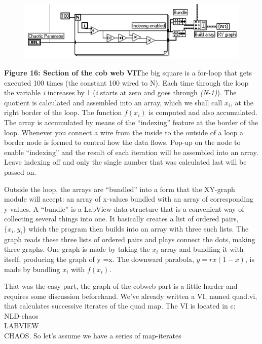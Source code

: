 \documentclass{../lab}
\begin{document}
\begin{figure}[h]
    \centering
    \href{http://experimentationlab.berkeley.edu/sites/default/files/images/Nldimage082.gif}{\includegraphics[width=0.5\linewidth]{images/Nldimage082.png}}
    \caption{}
    \label{fig:Nldimage082}
\end{figure}

\textbf{Figure 16: Section of the cob web VI}The big square is a for-loop that gets executed 100 times (the constant 100 wired to N). Each time through the loop the variable \emph{i} increases by 1 (\emph{i} starts at zero and goes through \emph{(N-1)}). The quotient is calculated and assembled into an array, which we shall call $ x_i $, at the right border of the loop. The function $ f(x_i) $ is computed and also accumulated. The array is accumulated by means of the ``indexing'' feature at the border of the loop. Whenever you connect a wire from the inside to the outside of a loop a border node is formed to control how the data flows. Pop-up on the node to enable ``indexing'' and the result of each iteration will be assembled into an array. Leave indexing off and only the single number that was calculated last will be passed on.

Outside the loop, the arrays are ``bundled'' into a form that the XY-graph module will accept: an array of x-values bundled with an array of corresponding y-values. A ``bundle'' is a LabView data-structure that is a convenient way of collecting several things into one. It basically creates a list of ordered pairs, $ \{x_i,y_i\} $ which the program then builds into an array with three such lists. The graph reads these three lists of ordered pairs and plays connect the dots, making three graphs. One graph is made by taking the $ x_i $ array and bundling it with itself, producing the graph of y =x. The downward parabola, $ y=rx(1-x) $, is made by bundling $ x_i $ with $ f(x_i) $.

That was the easy part, the graph of the cobweb part is a little harder and requires some discussion beforehand. We've already written a VI, named quad.vi, that calculates successive iterates of the quad map. The VI is located in c:\\NLD-chaos\\LABVIEW\\CHAOS. So let's assume we have a series of map-iterates
\end{document}
